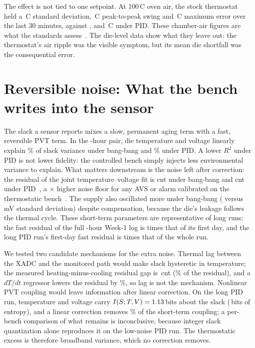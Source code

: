 \documentclass[10pt,twocolumn]{article}
\newcommand{\degC}{\,\textdegree C}
\begin{document}
The effect is not tied to one setpoint. At 100\degC{} oven air, the stock thermostat held a \vSdThermo\degC{} standard deviation, \vPtpThermo\degC{} peak-to-peak swing and \vEmaxThermo\degC{} maximum error over the last 30 minutes, against \vSdTuned, \vPtpTuned{} and \vEmaxTuned\degC{} under PID. These chamber-air figures are what the standards assess~\cite{jedec,mil}. The die-level data show what they leave out: the thermostat's air ripple was the visible symptom, but its mean die shortfall was the consequential error.

\section{Reversible noise: What the bench writes into the sensor}

The slack a sensor reports mixes a slow, permanent aging term with a fast, reversible PVT term. In the \vDurPair-hour pair, die temperature and voltage linearly explain \vRsqBB\% of slack variance under bang-bang and \vRsqPID\% under PID. A lower $R^2$ under PID is not lower fidelity: the controlled bench simply injects less environmental variance to explain. What matters downstream is the noise left after correction: the residual of the joint temperature--voltage fit is \vSigRawBB{} cnt under bang-bang and \vSigRawPID{} cnt under PID~\cite{sbcci26}, a \vSigRawRatio$\times$ higher noise floor for any AVS or alarm calibrated on the thermostatic bench~\cite{niemann}. The supply also oscillated more under bang-bang (\vVsdBB{} versus \vVsdPID\,mV standard deviation) despite compensation, because the die's leakage follows the thermal cycle. These short-term parameters are representative of long runs: the fast residual of the full \vDurBBlong-hour Week-1 log is \vBBlongSigRatio{} times that of its first day, and the long PID run's first-day fast residual is \vRCAfirstSigRatio{} times that of the whole run.

We tested two candidate mechanisms for the extra noise. Thermal lag between the XADC and the monitored path would make slack hysteretic in temperature; the measured heating-minus-cooling residual gap is \vHystBB\,cnt (\vHystPct\% of the residual), and a $dT/dt$ regressor lowers the residual by \vDtdtGainPct\%, so lag is not the mechanism. Nonlinear PVT coupling would leave information after linear correction. On the long PID run, temperature and voltage carry $I(S;T,V)=1.13$\,bits about the slack (\vHSRCA\,bits of entropy), and a linear correction removes \vRCAMIremoved\% of the short-term coupling; a per-bench comparison of what remains is inconclusive, because integer slack quantization alone reproduces it on the low-noise PID run. The thermostatic excess is therefore broadband variance, which no correction removes.
\end{document}
